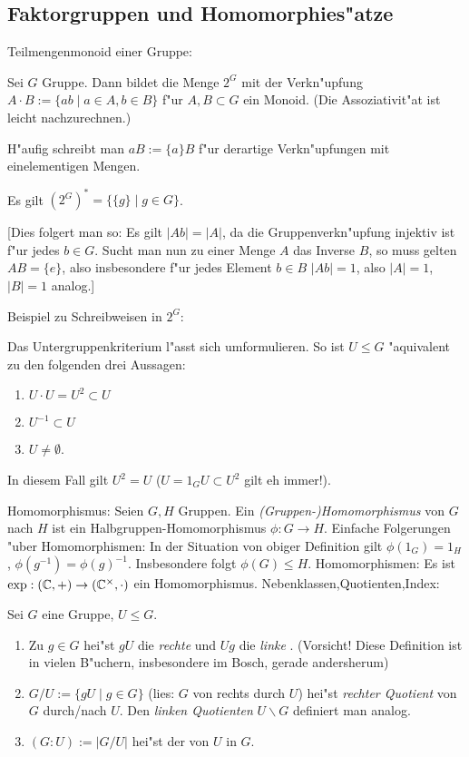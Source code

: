 \subsection{Faktorgruppen und Homomorphies"atze}
\remark Teilmengenmonoid einer Gruppe:{
  Sei $G$ Gruppe. Dann bildet die Menge $2^G$ mit der Verkn"upfung
  $A\cdot B:=\{ab\mid a\in A,b\in B\}$ f"ur $A,B\subset G$ ein Monoid. 
  (Die Assoziativit"at ist leicht nachzurechnen.)
  
  H"aufig schreibt man $aB:=\{a\}B$ f"ur derartige Verkn"upfungen mit
  einelementigen Mengen.
  
  Es gilt $(2^G)^*=\{\{g\}\mid g\in G\}$. 
  
  [Dies folgert man so: Es gilt $|Ab|=|A|$, da die Gruppenverkn"upfung
  injektiv ist f"ur jedes $b\in G$. Sucht man nun zu einer Menge $A$ das
  Inverse $B$, so muss gelten $AB=\{e\}$, also insbesondere f"ur
  jedes Element $b\in B$ $|Ab|=1$, also $|A|=1$, $|B|=1$ analog.]
  }
\example Beispiel zu Schreibweisen in $2^G$:{
  Das Untergruppenkriterium l"asst sich umformulieren. So ist $U\leq G$
  "aquivalent zu den folgenden drei Aussagen:
  \begin{enumerate}
    \item $U\cdot U=U^2\subset U$
    \item $U^{-1}\subset U$
    \item $U\neq\emptyset$.
    \end{enumerate}
  In diesem Fall gilt $U^2 =U$ ($U=1_GU\subset U^2$ gilt eh immer!).
  }
 Homomorphismus:{
   Seien $G,H$ Gruppen. Ein \emph{(Gruppen-)Homomorphismus} von $G$ nach $H$
   ist ein Halbgruppen-Homomorphismus $\phi:G\to H$.
   }
\remark Einfache Folgerungen "uber Homomorphismen:{
  In der Situation von obiger Definition gilt $\phi(1_G)=1_H$, $\phi(g^{-1})=\phi(g)^{-1}$.
  Insbesondere folgt $\phi(G)\leq H$.
  }
\example Homomorphismen:{
  Es ist $\operatorname{exp}:(\mathbb C,+)\to (\mathbb C^\times ,\cdot)$ ein Homomorphismus.
  }
 Nebenklassen,Quotienten,Index:{
  Sei $G$ eine Gruppe, $U\leq G$.
  \begin{enumerate}
    \item Zu $g\in G$ hei"st $gU$ die \emph{rechte} und $Ug$ die
      \emph{linke} \emph{}.
      (Vorsicht! Diese Definition ist in vielen B"uchern, insbesondere
      im Bosch, gerade andersherum)
    \item 
      $G/U:=\{gU\mid g\in G\}$ (lies: $G$ von rechts durch $U$) hei"st
      \emph{rechter Quotient} von $G$ durch/nach $U$. 
      Den \emph{linken Quotienten} $U\backslash G$ definiert man analog.
    \item $(G:U):=|G/U|$ hei"st der \emph{} von $U$ in $G$.
    \end{enumerate}
  }
